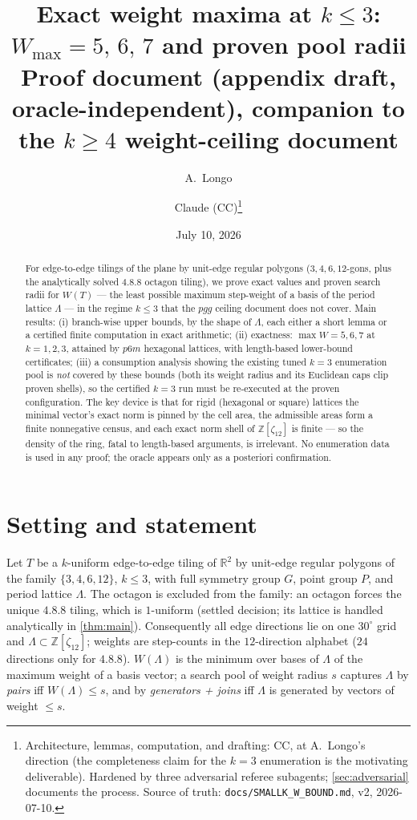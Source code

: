 \documentclass[11pt,a4paper,oneside]{article}
\title{Exact weight maxima at $k \le 3$:\\
$W_{\max} = 5,\, 6,\, 7$ and proven pool radii\\[1ex]
\large Proof document (appendix draft, oracle-independent), companion to the
$k\ge 4$ weight-ceiling document}
\author{A.~Longo \and Claude (CC)\thanks{Architecture, lemmas, computation, and drafting:
CC, at A.~Longo's direction (the completeness claim for the $k=3$ enumeration is the
motivating deliverable). Hardened by three adversarial referee subagents;
\cref{sec:adversarial} documents the process. Source of truth:
\texttt{docs/SMALLK\_W\_BOUND.md}, v2, 2026-07-10.}}
\date{July 10, 2026}
\theoremstyle{plain}
\theoremstyle{definition}
\theoremstyle{remark}
\newcommand{\ZZ}{\mathbb{Z}}
\newcommand{\RR}{\mathbb{R}}
\newcommand{\zt}[1]{\zeta_{#1}}
\begin{document}
\maketitle

\begin{abstract}
\noindent For edge-to-edge tilings of the plane by unit-edge regular polygons
($3,4,6,12$-gons, plus the analytically solved $4.8.8$ octagon tiling), we prove exact
values and proven search radii for $W(T)$ --- the least possible maximum step-weight of a
basis of the period lattice $\Lambda$ --- in the regime $k \le 3$ that the $pgg$ ceiling
document does not cover. Main results: (i) branch-wise upper bounds, by the shape of
$\Lambda$, each either a short lemma or a certified finite computation in exact arithmetic;
(ii) exactness: $\max W = 5, 6, 7$ at $k = 1, 2, 3$, attained by $p6m$ hexagonal lattices,
with length-based lower-bound certificates; (iii) a consumption analysis showing the
existing tuned $k=3$ enumeration pool is \emph{not} covered by these bounds (both its weight
radius and its Euclidean caps clip proven shells), so the certified $k=3$ run must be
re-executed at the proven configuration. The key device is that for rigid (hexagonal or
square) lattices the minimal vector's exact norm is pinned by the cell area, the admissible
areas form a finite nonnegative census, and each exact norm shell of $\ZZ[\zt{12}]$ is
finite --- so the density of the ring, fatal to length-based arguments, is irrelevant. No
enumeration data is used in any proof; the oracle appears only as a posteriori confirmation.
\end{abstract}

\section{Setting and statement}\label{sec:setting}

Let $T$ be a $k$-uniform edge-to-edge tiling of $\RR^2$ by unit-edge regular polygons of
the family $\{3,4,6,12\}$, $k \le 3$, with full symmetry group $G$, point group $P$, and
period lattice $\Lambda$. The octagon is excluded from the family: an octagon forces the
unique $4.8.8$ tiling, which is $1$-uniform (settled decision; its lattice is handled
analytically in \cref{thm:main}). Consequently all edge directions lie on one $30^\circ$
grid and $\Lambda \subset \ZZ[\zt{12}]$; weights are step-counts in the $12$-direction
alphabet ($24$ directions only for $4.8.8$). $W(\Lambda)$ is the minimum over bases of
$\Lambda$ of the maximum weight of a basis vector; a search pool of weight radius $s$
captures $\Lambda$ by \emph{pairs} iff $W(\Lambda) \le s$, and by \emph{generators + joins}
iff $\Lambda$ is generated by vectors of weight $\le s$.
\end{document}
